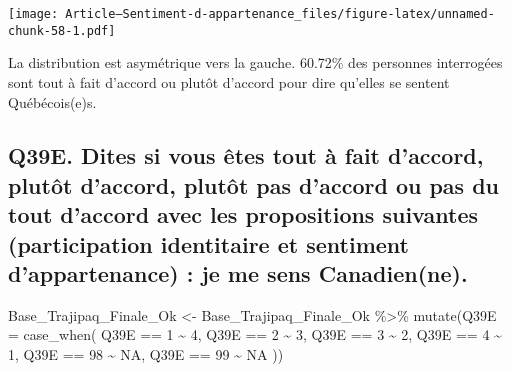 \documentclass[
]{article}
\newenvironment{Shaded}{\begin{snugshade}}{\end{snugshade}}
\newcommand{\AttributeTok}[1]{\textcolor[rgb]{0.77,0.63,0.00}{#1}}
\newcommand{\ConstantTok}[1]{\textcolor[rgb]{0.00,0.00,0.00}{#1}}
\newcommand{\DecValTok}[1]{\textcolor[rgb]{0.00,0.00,0.81}{#1}}
\newcommand{\FunctionTok}[1]{\textcolor[rgb]{0.00,0.00,0.00}{#1}}
\newcommand{\NormalTok}[1]{#1}
\newcommand{\OtherTok}[1]{\textcolor[rgb]{0.56,0.35,0.01}{#1}}
\newcommand{\SpecialCharTok}[1]{\textcolor[rgb]{0.00,0.00,0.00}{#1}}
\begin{document}
\texttt{[image: Article---Sentiment-d-appartenance\_files/figure-latex/unnamed-chunk-58-1.pdf]}

La distribution est asymétrique vers la gauche. 60.72\% des personnes
interrogées sont tout à fait d'accord ou plutôt d'accord pour dire
qu'elles se sentent Québécois(e)s.

\hypertarget{q39e.-dites-si-vous-uxeates-tout-uxe0-fait-daccord-plutuxf4t-daccord-plutuxf4t-pas-daccord-ou-pas-du-tout-daccord-avec-les-propositions-suivantes-participation-identitaire-et-sentiment-dappartenance-je-me-sens-canadienne.}{%
\subsection{Q39E. Dites si vous êtes tout à fait d'accord, plutôt
d'accord, plutôt pas d'accord ou pas du tout d'accord avec les
propositions suivantes (participation identitaire et sentiment
d'appartenance) : je me sens
Canadien(ne).}\label{q39e.-dites-si-vous-uxeates-tout-uxe0-fait-daccord-plutuxf4t-daccord-plutuxf4t-pas-daccord-ou-pas-du-tout-daccord-avec-les-propositions-suivantes-participation-identitaire-et-sentiment-dappartenance-je-me-sens-canadienne.}}

\begin{Shaded}
\begin{Highlighting}[]
\NormalTok{Base\_Trajipaq\_Finale\_Ok }\OtherTok{\textless{}{-}}
\NormalTok{  Base\_Trajipaq\_Finale\_Ok }\SpecialCharTok{\%\textgreater{}\%}
  \FunctionTok{mutate}\NormalTok{(}\AttributeTok{Q39E =} \FunctionTok{case\_when}\NormalTok{(}
\NormalTok{    Q39E }\SpecialCharTok{==} \DecValTok{1} \SpecialCharTok{\textasciitilde{}} \DecValTok{4}\NormalTok{,}
\NormalTok{    Q39E }\SpecialCharTok{==} \DecValTok{2} \SpecialCharTok{\textasciitilde{}} \DecValTok{3}\NormalTok{,}
\NormalTok{    Q39E }\SpecialCharTok{==} \DecValTok{3} \SpecialCharTok{\textasciitilde{}} \DecValTok{2}\NormalTok{,}
\NormalTok{    Q39E }\SpecialCharTok{==} \DecValTok{4} \SpecialCharTok{\textasciitilde{}} \DecValTok{1}\NormalTok{,}
\NormalTok{    Q39E }\SpecialCharTok{==} \DecValTok{98} \SpecialCharTok{\textasciitilde{}} \ConstantTok{NA}\NormalTok{,}
\NormalTok{    Q39E }\SpecialCharTok{==} \DecValTok{99} \SpecialCharTok{\textasciitilde{}} \ConstantTok{NA}
\NormalTok{  ))}
\end{Highlighting}
\end{Shaded}

\begin{Shaded}
\end{Shaded}
\end{document}
